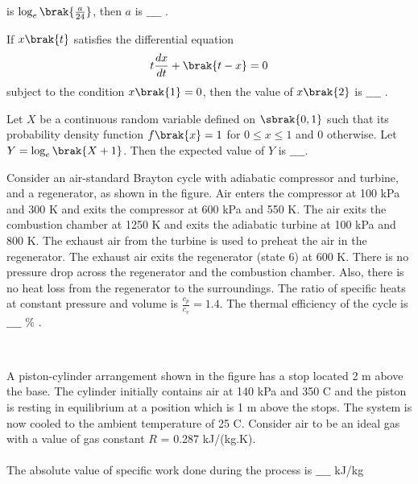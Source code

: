 is $\log_e\brak{\frac{a}{24}}$, then $a$ is $\_\_\_\_$ . \\
\item If $x\brak{t}$ satisfies the differential equation
\begin{align*}
    t\frac{dx}{dt} + \brak{t - x} = 0
\end{align*}
subject to the condition $x\brak{1} = 0$, then the value of $x\brak{2}$ is $\_\_\_\_$ . \\
\item Let $X$ be a continuous random variable defined on $\sbrak{0,1}$ such that its probability density function $f\brak{x} = 1$ for $0 \leq x \leq 1$ and 0 otherwise. Let $Y = \log_e\brak{X + 1}$. Then the expected value of $Y$ is $\_\_\_\_$.  \\
\item Consider an air-standard Brayton cycle with adiabatic compressor and turbine, and a regenerator, as shown in the figure. Air enters the compressor at 100 kPa and 300 K and exits the compressor at 600 kPa and 550 K. The air exits the combustion chamber at 1250 K and exits the adiabatic turbine at 100 kPa and 800 K. The exhaust air from the turbine is used to preheat the air in the regenerator. The exhaust air exits the regenerator (state 6) at 600 K. There is no pressure drop across the regenerator and the combustion chamber. Also, there is no heat loss from the regenerator to the surroundings. The ratio of specific heats at constant pressure and volume is $\frac{c_p}{c_v} =
1.4$. The thermal efficiency of the cycle is $\_\_\_\_$ \% .
\begin{figure}[!ht]
\centering
\resizebox{0.9\textwidth}{!}{%

}%
\end{figure}\\
\item A piston-cylinder arrangement shown in the figure has a stop located 2 m above the base. The cylinder initially contains air at 140 kPa and 350 \degree C and the piston is resting in equilibrium at a position which is 1 m above the stops. The system is now cooled to the ambient temperature of 25 \degree C. Consider air to be an ideal gas with a value of gas constant $R$ = 0.287 kJ/(kg.K). \\\\
The absolute value of specific work done during the process is $\_\_\_\_$ kJ/kg
